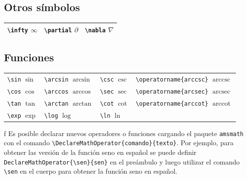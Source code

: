 \documentclass[
  a4paper,
]{scrreport}
\begin{document}
\hypertarget{otros-suxedmbolos}{%
\subsection{Otros símbolos}\label{otros-suxedmbolos}}

\begin{longtable}[]{@{}lll@{}}
\toprule()
\endhead
\texttt{\textbackslash{}infty} \(\infty\) &
\texttt{\textbackslash{}partial} \(\partial\) &
\texttt{\textbackslash{}nabla} \(\nabla\) \\
\bottomrule()
\end{longtable}

\hypertarget{funciones}{%
\subsection{Funciones}\label{funciones}}

\begin{longtable}[]{@{}
  >{\raggedright\arraybackslash}p{}
  >{\raggedright\arraybackslash}p{}
  >{\raggedright\arraybackslash}p{}
  >{\raggedright\arraybackslash}p{}@{}}
\toprule()
\endhead
\texttt{\textbackslash{}sin} \(\sin\) & \texttt{\textbackslash{}arcsin}
\(\arcsin\) & \texttt{\textbackslash{}csc} \(\csc\) &
\texttt{\textbackslash{}operatorname\{arccsc\}}
\(\operatorname{arccsc}\) \\
\texttt{\textbackslash{}cos} \(\cos\) & \texttt{\textbackslash{}arccos}
\(\arccos\) & \texttt{\textbackslash{}sec} \(\sec\) &
\texttt{\textbackslash{}operatorname\{arcsec\}}
\(\operatorname{arcsec}\) \\
\texttt{\textbackslash{}tan} \(\tan\) & \texttt{\textbackslash{}arctan}
\(\arctan\) & \texttt{\textbackslash{}cot} \(\cot\) &
\texttt{\textbackslash{}operatorname\{arccot\}}
\(\operatorname{arccot}\) \\
\texttt{\textbackslash{}exp} \(\exp\) & \texttt{\textbackslash{}log}
\(\log\) & \texttt{\textbackslash{}ln} \(\ln\) & \\
\bottomrule()
\end{longtable}

f Es posible declarar nuevos operadores o funciones cargando el paquete
\texttt{amsmath} con el comando
\texttt{\textbackslash{}DeclareMathOperator\{comando\}\{texto\}}. Por
ejemplo, para obtener las versión de la función seno en español se puede
definir \texttt{DeclareMathOperator\{\textbackslash{}sen\}\{sen\}} en el
preámbulo y luego utilizar el comando \texttt{\textbackslash{}sen} en el
cuerpo para obtener la función seno en español.
\end{document}

